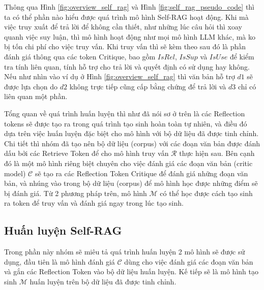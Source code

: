 \documentclass{article}
\begin{document}
Thông qua Hình \ref{fig:overview_self_rag} và Hình \ref{fig:self_rag_pseudo_code} thì ta có thể phần nào hiểu được quá trình mô hình Self-RAG hoạt động. Khi mà việc truy xuất để trả lời để không cần thiết, như những lúc câu hỏi thì xoay quanh việc suy luận, thì mô hình hoạt động như mọi mô hình LLM khác, mà ko bị tốn chi phí cho việc truy vấn. Khi truy vấn thì sẽ kèm theo sau đó là phần đánh giá thông qua các token Critique, bao gồm $IsRel$, $IsSup$ và $IsUse$ để kiểm tra tính liên quan, tính hỗ trợ cho trả lời và quyết định có sử dụng hay không. Nếu như nhìn vào ví dụ ở Hình \ref{fig:overview_self_rag} thì văn bản hỗ trợ $d1$ sẽ được lựa chọn do $d2$ không trực tiếp cũng cấp bằng chứng để trả lời và $d3$ chỉ có liên quan một phần. 

Tổng quan về quá trình huấn luyện thì như đã nói sơ ở trên là các Reflection tokens sẽ được tạo ra trong quá trình tạo sinh hoàn toàn tự nhiên, và điều đó dựa trên việc huấn luyện đặc biệt cho mô hình với bộ dữ liệu đã được tinh chỉnh. Chi tiết thì nhóm đã tạo nên bộ dữ liệu (corpus) với các đoạn văn bản được đánh dấu bởi các Retrieve Token để cho mô hình truy vấn $\mathcal{R}$ thực hiện sau. Bên cạnh đó là một mô hình riêng biệt chuyên cho việc đánh giá các đoạn văn bản (critic model) $\mathcal{C}$ sẽ tạo ra các Reflection Token Critique để đánh giá những đoạn văn bản, và nhúng vào trong bộ dữ liệu (corpus) để mô hình học được những điểm sẽ bị đánh giá. Từ 2 phương pháp trên, mô hình $\mathcal{M}$ có thể học được cách tạo sinh ra token để truy vấn và đánh giá ngay trong lúc tạo sinh. 

\subsection{Huấn luyện Self-RAG}
Trong phần này nhóm sẽ miêu tả quá trình huấn luyện 2 mô hình sẽ được sử dụng, đầu tiên là mô hình đánh giá $\mathcal{C}$ dùng cho việc đánh giá các đoạn văn bản và gắn các Reflection Token vào bộ dữ liệu huấn luyện. Kế tiếp sẽ là mô hình tạo sinh $\mathcal{M}$ huấn luyện trên bộ dữ liệu đã được tinh chỉnh.
\end{document}
